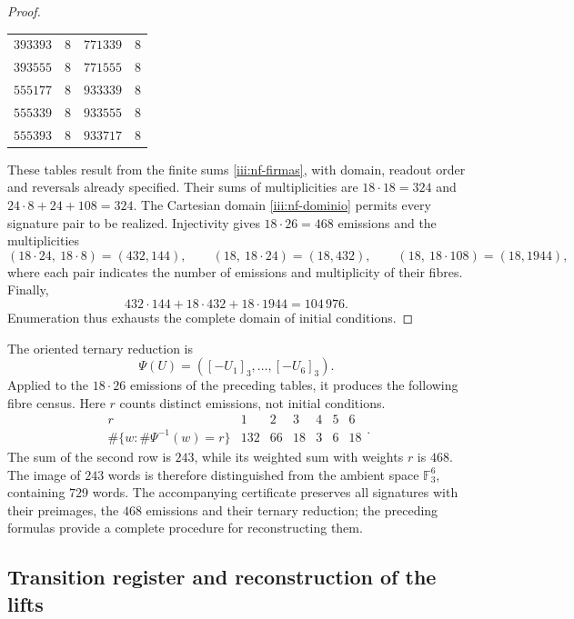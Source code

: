 \begin{proof}
\begin{center}
\begin{tabular}{rr@{\qquad}rr}
$393393$&$8$&$771339$&$8$\\
$393555$&$8$&$771555$&$8$\\
$555177$&$8$&$933339$&$8$\\
$555339$&$8$&$933555$&$8$\\
$555393$&$8$&$933717$&$8$
\end{tabular}
\end{center}
These tables result from the finite sums \eqref{iii:nf-firmas}, with
domain, readout order and reversals already specified. Their sums
of multiplicities are $18\cdot18=324$ and
$24\cdot8+24+108=324$. The Cartesian domain
\eqref{iii:nf-dominio} permits every signature pair to be realized.
Injectivity gives $18\cdot26=468$ emissions and the
multiplicities
\[
 (18\cdot24,\ 18\cdot8)=(432,144),\qquad
 (18,\ 18\cdot24)=(18,432),\qquad
 (18,\ 18\cdot108)=(18,1944),
\]
where each pair indicates the number of emissions and multiplicity of their fibres.
Finally,
\[
 432\cdot144+18\cdot432+18\cdot1944=104\,976.
\]
Enumeration thus exhausts the complete domain of initial conditions.
\end{proof}

The oriented ternary reduction is
\[
 \Psi(U)=([-U_1]_3,\ldots,[-U_6]_3).
\]
Applied to the $18\cdot26$ emissions of the preceding tables,
it produces the following fibre census. Here $r$ counts distinct
emissions, not initial conditions.
\begin{equation}
 \begin{array}{c|rrrrrr}
 r&1&2&3&4&5&6\\ \hline
 \#\{w:\#\Psi^{-1}(w)=r\}&132&66&18&3&6&18
 \end{array}.
 \label{iii:nf-censo-ternario}
\end{equation}
The sum of the second row is $243$, while its weighted sum
with weights $r$ is $468$. The image of $243$ words is therefore distinguished
from the ambient space $\mathbb F_3^6$, containing $729$ words. The accompanying
certificate preserves all signatures with their preimages, the $468$
emissions and their ternary reduction; the preceding formulas provide
a complete procedure for reconstructing them.

\subsection{Transition register and reconstruction of the lifts}


